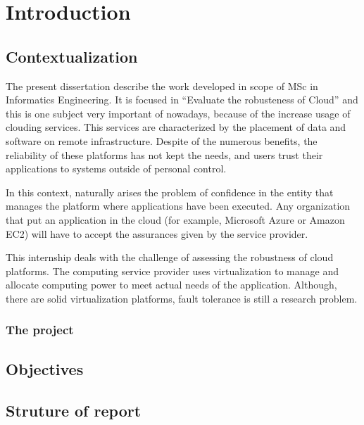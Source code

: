 \newpage
\section{Introduction}

\subsection{Contextualization}
The present dissertation describe the work developed in scope of MSc in Informatics Engineering. It is focused in ``Evaluate the robusteness of Cloud'' and this is one subject very important of nowadays, because of the increase usage of clouding services.
This services are characterized by the placement of data and software on remote infrastructure. Despite of the numerous benefits, the reliability of these platforms has not kept the needs, and users trust their applications to systems outside of personal control. 

In this context, naturally arises the problem of confidence in the entity that manages the platform where applications have been executed. Any organization that put an application in the cloud (for example, Microsoft Azure or Amazon EC2) will have to accept the assurances given by the service provider.

This internship deals with the challenge of assessing the robustness of cloud platforms. The computing service provider uses virtualization to manage and allocate computing power to meet actual needs of the application. Although, there are solid virtualization platforms, fault tolerance is still a research problem.



\subsubsection{The project}

\subsection{Objectives}

\subsection{Struture of report}


